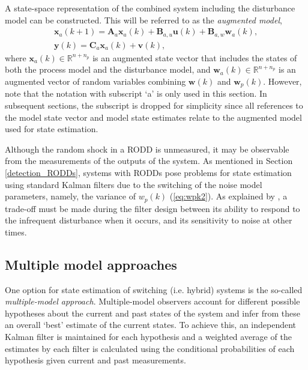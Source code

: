 A state-space representation of the combined system including the disturbance model can be constructed. This will be referred to as the \textit{augmented model},
\begin{equation} \label{eq:ss_rep_xa}
	\begin{aligned}
		\mathbf{x}_a(k+1) = \mathbf{A}_a \mathbf{x}_a(k) + \mathbf{B}_{a,u} \mathbf{u}(k) + \mathbf{B}_{a,w} \mathbf{w}_{a}(k), \\
		\mathbf{y}(k) = \mathbf{C}_a \mathbf{x}_a(k) + \mathbf{v}(k),
	\end{aligned}
\end{equation}
where $\mathbf{x}_a(k) \in \mathbb{R}^{n+n_p}$ is an augmented state vector that includes the states of both the process model and the disturbance model, and $\mathbf{w}_a(k) \in \mathbb{R}^{n+n_p}$ is an augmented vector of random variables combining $\mathbf{w}(k)$ and $\mathbf{w}_p(k)$. However, note that the notation with subscript `a' is only used in this section. In subsequent sections, the subscript is dropped for simplicity since all references to the model state vector and model state estimates relate to the augmented model used for state estimation.

Although the random shock in a \gls{RODD} is unmeasured, it may be observable from the measurements of the outputs of the system. As mentioned in Section \ref{detection_RODDs}, systems with \gls{RODD}s pose problems for state estimation using standard Kalman filters due to the switching of the noise model parameters, namely, the variance of $w_p(k)$ (\ref{eq:wpk2}). As explained by \cite{andersson_adaptive_1985}, a trade-off must be made during the filter design between its ability to respond to the infrequent disturbance when it occurs, and its sensitivity to noise at other times.


\subsection{Multiple model approaches} \label{sec:multi-model}

One option for state estimation of switching (i.e. hybrid) systems is the so-called \textit{multiple-model approach}. Multiple-model observers account for different possible hypotheses about the current and past states of the system and infer from these an overall `best' estimate of the current states. To achieve this, an independent Kalman filter is maintained for each hypothesis and a weighted average of the estimates by each filter is calculated using the conditional probabilities of each hypothesis given current and past measurements.

